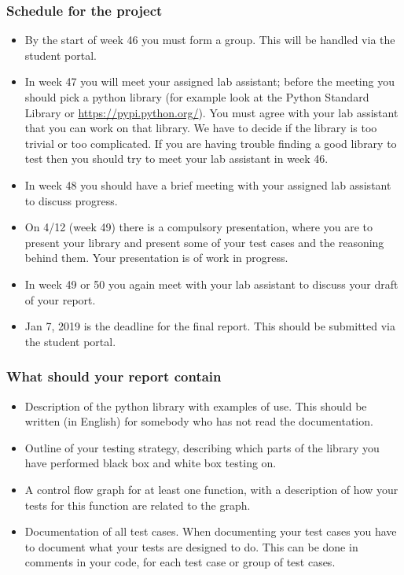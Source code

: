 \documentclass[a4page]{article}
\begin{document}
\subsubsection*{Schedule for the project}
  \begin{itemize}
  \item By  the start of  week  46 you must form a group. This will be
    handled via the student portal.
  \item In week 47 you will meet your assigned lab assistant; before the
    meeting you should pick a python library (for example look at the Python
    Standard Library or \url{https://pypi.python.org/}). You must agree
    with your lab assistant that you can work on that library. We have
    to decide if the library is too trivial or too complicated. If you are
    having trouble finding a good library to test then you should try to meet
    your lab assistant in week 46.
  \item In week 48 you should have a brief meeting with your assigned lab
    assistant to discuss progress.
  \item On 4/12 (week 49) there is a compulsory presentation, where you are
      to present your library and present some of your test cases
      and the reasoning behind them. Your presentation is of work in
      progress.
    \item In week 49 or 50 you again meet with your lab assistant to
      discuss your draft of your  report.
    \item Jan 7,  2019 is  the deadline for the final
      report. This should be submitted via the student portal.

\end{itemize}



  \subsubsection*{What should your report contain}
  \begin{itemize}
  \item Description of the python library with examples of use. This should be
    written (in English) for somebody who has not read the documentation.
  \item Outline of your testing strategy, describing which parts of the library 
    you have performed black box and white box testing on.
  \item A control flow graph for at least one function, with a description of 
    how your tests for this function are related to the graph.
  \item Documentation of all test cases.  When documenting your test cases
    you have to document what your tests are designed to do. This can be done
    in comments in your code, for each test case or group of test cases.
  \end{itemize}
\end{document}
